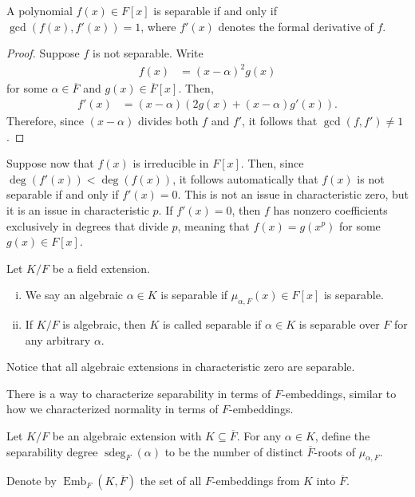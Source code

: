 \documentclass[10pt]{mypackage}
\begin{document}
\begin{proposition}
  A polynomial $f(x)\in F[x]$ is separable if and only if $\gcd\left( f(x),f'(x) \right) = 1$, where $f'(x)$ denotes the formal derivative of $f$.
\end{proposition}
\begin{proof}
  Suppose $f$ is not separable. Write
  \begin{align*}
    f(x) &= \left( x-\alpha \right)^2 g(x)
  \end{align*}
  for some $\alpha\in \overline{F}$ and $g(x)\in \overline{F}[x]$. Then,
  \begin{align*}
    f'(x) &= \left( x-\alpha \right)\left( 2g(x) + \left( x-\alpha \right)g'(x) \right).
  \end{align*}
  Therefore, since $\left( x-\alpha \right)$ divides both $f$ and $f'$, it follows that $\gcd\left( f,f' \right)\neq 1$.
\end{proof}
Suppose now that $f(x)$ is irreducible in $F[x]$. Then, since $\deg\left( f'(x) \right) < \deg\left( f(x) \right)$, it follows automatically that $f(x)$ is not separable if and only if $f'(x) = 0$. This is not an issue in characteristic zero, but it is an issue in characteristic $p$. If $f'(x) = 0$, then $f$ has nonzero coefficients exclusively in degrees that divide $p$, meaning that $f(x) = g\left(x^{p}\right)$ for some $g(x)\in F[x]$.
\begin{definition}
  Let $K/F$ be a field extension.
  \begin{enumerate}[(i)]
    \item We say an algebraic $\alpha\in K$ is separable if $\mu_{\alpha,F}(x)\in F[x]$ is separable.
    \item If $K/F$ is algebraic, then $K$ is called separable if $\alpha\in K$ is separable over $F$ for any arbitrary $\alpha$.
  \end{enumerate}
\end{definition}
Notice that all algebraic extensions in characteristic zero are separable.

There is a way to characterize separability in terms of $F$-embeddings, similar to how we characterized normality in terms of $F$-embeddings.
\begin{definition}
  Let $K/F$ be an algebraic extension with $K\subseteq \overline{F}$. For any $\alpha\in K$, define the separability degree $\operatorname{sdeg}_{F}\left( \alpha \right)$ to be the number of distinct $ \overline{F} $-roots of $\mu_{\alpha,F}$.
\end{definition}
Denote by $\operatorname{Emb}_{F}\left( K, \overline{F} \right)$ the set of all $F$-embeddings from $K$ into $ \overline{F} $.
\end{document}
